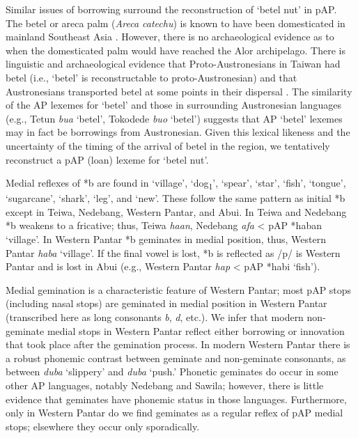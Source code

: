 Similar issues of borrowing surround the reconstruction of `betel nut' in pAP. The betel or areca palm (\textit{Areca catechu}) is known to have been domesticated in mainland Southeast Asia \citep{Yen1977}. However, there is no archaeological evidence as to when the domesticated palm would have reached the Alor archipelago. There is linguistic and archaeological evidence that Proto-Austronesians in Taiwan had betel (i.e., `betel' is reconstructable to proto-Austronesian) and that Austronesians transported betel at some points in their dispersal \citep{Lichtenberk1998}. The similarity of the AP lexemes for `betel' and those in surrounding Austronesian languages (e.g., Tetun \textit{bua} `betel', Tokodede \textit{buo} `betel') suggests that AP `betel' lexemes may in fact be borrowings from Austronesian. Given this lexical likeness and the uncertainty of the timing of the arrival of betel in the region, we tentatively reconstruct a pAP (loan) lexeme for `betel nut'.

Medial reflexes of *b are found in `village', `dog\textsubscript{1}', `spear', `star', `fish', `tongue', `sugarcane', `shark', `leg', and `new'. These follow the same pattern as initial *b except in Teiwa, Nedebang, Western Pantar, and Abui. In Teiwa and Nedebang *b weakens to a fricative; thus, Teiwa \textit{ha{\textphi}an}, Nedebang \textit{afa{\ng}} {\textless} pAP *haban `village'. In Western Pantar *b geminates in medial position, thus, Western Pantar \textit{hab{\textlengthmark}a{\ng}} `village'. If the final vowel is lost, *b is reflected as /p/ is Western Pantar and is lost in Abui (e.g., Western Pantar \textit{hap} {\textless} pAP *habi `fish').

Medial gemination is a characteristic feature of Western Pantar; most pAP stops (including nasal stops) are geminated in medial position in Western Pantar (transcribed here as long consonants\textit{ b{\textlengthmark}},\textit{ d{\textlengthmark}}, etc.). We infer that modern non-geminate medial stops in Western Pantar reflect either borrowing or innovation that took place after the gemination process. In modern Western Pantar there is a robust phonemic contrast between geminate and non-geminate consonants, as between \textit{duba }`slippery' and \textit{dub{\textlengthmark}a }`push.' Phonetic geminates do occur in some other AP languages, notably Nedebang and Sawila; however, there is little evidence that geminates have phonemic status in those languages. Furthermore, only in Western Pantar do we find geminates as a regular reflex of pAP medial stops; elsewhere they occur only sporadically.

